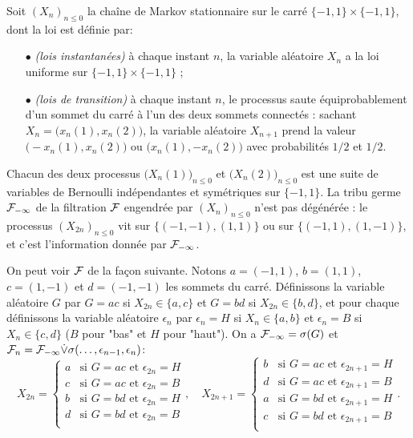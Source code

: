 \documentclass[12pt,a4paper]{article}
\begin{document}
\begin{exemple}
Soit ${(X_n)}_{n \leq 0}$ la chaîne de Markov stationnaire sur le carré 
$\{-1,1\}\times\{-1,1\}$, dont la loi est définie par:
\begin{itemize}
\item[$\bullet$] \emph{(lois instantanées)} à chaque instant $n$, la variable aléatoire 
$X_n$ a la loi uniforme sur $\{-1,1\}\times\{-1,1\}$ ;

\item[$\bullet$] \emph{(lois de transition)} à chaque instant $n$, le processus 
saute équiprobablement d'un sommet du carré à l'un des deux sommets connectés : 
sachant $X_n=\bigl(x_n(1), x_n(2)\bigr)$, la variable aléatoire $X_{n+1}$ 
prend la valeur $\bigl(-x_n(1), x_n(2)\bigr)$ ou $\bigl(x_n(1), -x_n(2)\bigr)$ avec 
probabilités $1/2$ et $1/2$. 
\end{itemize}
Chacun des deux processus ${\bigl(X_n(1)\bigr)}_{n \leq 0}$ et ${\bigl(X_n(2)\bigr)}_{n \leq 0}$ 
est une suite de variables de Bernoulli indépendantes et symétriques sur $\{-1,1\}$. 
La tribu germe $\mathcal{F}_{-\infty}$ de la filtration $\mathcal{F}$ engendrée par 
${(X_n)}_{n \leq 0}$ n'est pas dégénérée : le processus ${(X_{2n})}_{n \leq 0}$ 
vit sur $\bigl\{(-1,-1), (1,1)\bigr\}$ ou sur $\bigl\{(-1,1), (1,-1)\bigr\}$, 
et c'est l'information donnée par $\mathcal{F}_{-\infty}$. 

On peut voir $\mathcal{F}$ de la façon suivante. 
Notons $a=(-1,1)$, $b=(1,1)$, $c=(1,-1)$ et $d=(-1,-1)$ les sommets du carré. 
Définissons la variable aléatoire $G$ par $G=ac$ si $X_{2n} \in \{a,c\}$ et 
$G=bd$ si  $X_{2n} \in \{b,d\}$, et pour chaque définissons 
la variable aléatoire $\epsilon_n$ par $\epsilon_n=H$ si $X_n \in \{a,b\}$ 
et $\epsilon_n=B$ si $X_n \in \{c,d\}$  ($B$ pour "bas" et $H$ pour "haut"). 
On a $\mathcal{F}_{-\infty} = \sigma(G)$ et 
$\mathcal{F}_n = \mathcal{F}_{-\infty} \dot{\vee} \sigma(\ldots, \epsilon_{n-1}, \epsilon_n)$:
$$
X_{2n} = \begin{cases}
a & \text{si $G=ac$ et $\epsilon_{2n}=H$} \\
c & \text{si $G=ac$ et $\epsilon_{2n}=B$} \\
b & \text{si $G=bd$ et $\epsilon_{2n}=H$} \\
d & \text{si $G=bd$ et $\epsilon_{2n}=B$} \\
\end{cases},
\quad
X_{2n+1} = \begin{cases}
b & \text{si $G=ac$ et $\epsilon_{2n+1}=H$} \\
d & \text{si $G=ac$ et $\epsilon_{2n+1}=B$} \\
a & \text{si $G=bd$ et $\epsilon_{2n+1}=H$} \\
c & \text{si $G=bd$ et $\epsilon_{2n+1}=B$} \\
\end{cases}.
$$
%
\end{exemple}
\end{document}
